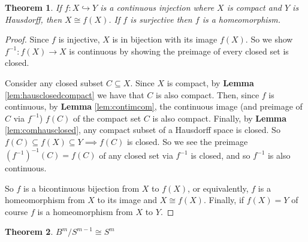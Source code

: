 \documentclass[addpoints,10pt]{exam}
\theoremstyle{plain}
\newcommand{\theoremname}{Theorem}
\newtheorem{thm}{\protect\theoremname}
\theoremstyle{definition}
\theoremstyle{plain}
\theoremstyle{plain}
\theoremstyle{definition}
\begin{document}
    
    \begin{thm}\label{thm:contimjhom} If $f:X\hookrightarrow Y$ is a continuous injection where $X$ is compact and $Y$ is Hausdorff, then $X\cong f(X)$. If $f$ is surjective then $f$ is a homeomorphism.
    \end{thm}
  \begin{proof}
    Since $f$ is injective, $X$ is in bijection with its image $f(X)$. So we show $f^{-1}:f(X)\to X$ is continuous by showing the preimage of every closed set is closed.

    Consider any closed subset $C\subseteq X$. Since $X$ is compact, by \textbf{Lemma }\ref{lem:hausclosedcompact} we have that $C$ is also compact. Then, since $f$ is continuous, by \textbf{Lemma }\ref{lem:contimcom}, the continuous image (and preimage of $C$ via $f^{-1}$) $f(C)$ of the compact set $C$ is also compact. Finally, by \textbf{Lemma }\ref{lem:comhausclosed}, any compact subset of a Hausdorff space is closed. So $f(C)\subseteq f(X)\subseteq Y\implies f(C)$ is closed. So we see the preimage $(f^{-1})^{-1}(C)=f(C)$ of any closed set via $f^{-1}$ is closed, and so $f^{-1}$ is also continuous. 
    
    So $f$ is a bicontinuous bijection from $X$ to $f(X)$, or equivalently, $f$ is a homeomorphism from $X$ to its image and $X\cong f(X)$. Finally, if $f(X)=Y$ of course $f$ is a homeomorphism from $X$ to $Y.$

  \end{proof}

  \begin{thm}\label{thm:ballquotienthomeo} $B^{m}/S^{m-1}\cong S^{m}$
\end{thm}
\end{document}
